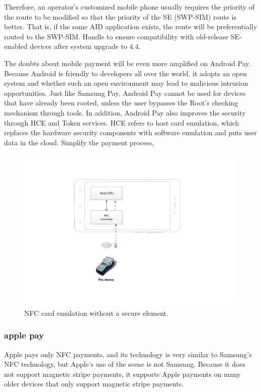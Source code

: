 \documentclass[journal]{IEEEtran}
\begin{document}
Therefore, an operator's customized mobile phone usually requires the priority of the route to be modified so that the priority of the SE (SWP-SIM) route is better. That is, if the same AID application exists, the route will be preferentially routed to the SWP-SIM. Handle to ensure compatibility with old-release SE-enabled devices after system upgrade to 4.4.


The doubts about mobile payment will be even more amplified on Android Pay. Because Android is friendly to developers all over the world, it adopts an open system and whether such an open environment may lead to malicious intrusion opportunities. Just like Samsung Pay, Android Pay cannot be used for devices that have already been rooted, unless the user bypasses the Root's checking mechanism through tools. In addition, Android Pay also improves the security through HCE and Token services. HCE refers to host card emulation, which replaces the hardware security components with software emulation and puts user data in the cloud. Simplify the payment process,

\begin{figure}[htbp]
\centerline{\includegraphics[scale=0.58]{NFC_cpu.pdf}}
\caption{NFC card emulation without a secure element.}
\label{fig}
\end{figure}

\subsubsection{apple pay}
Apple pays only NFC payments, and its technology is very similar to Samsung's NFC technology, but Apple's use of the scene is not Samsung. Because it does not support magnetic stripe payments, it supports Apple payments on many older devices that only support magnetic stripe payments.
\end{document}
